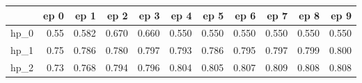 \begin{tabular}{lrrrrrrrrrr}
\toprule
{} &  ep 0 &   ep 1 &   ep 2 &   ep 3 &   ep 4 &   ep 5 &   ep 6 &   ep 7 &   ep 8 &   ep 9 \\
\midrule
hp\_0 &  0.55 &  0.582 &  0.670 &  0.660 &  0.550 &  0.550 &  0.550 &  0.550 &  0.550 &  0.550 \\
hp\_1 &  0.75 &  0.786 &  0.780 &  0.797 &  0.793 &  0.786 &  0.795 &  0.797 &  0.799 &  0.800 \\
hp\_2 &  0.73 &  0.768 &  0.794 &  0.796 &  0.804 &  0.805 &  0.807 &  0.809 &  0.808 &  0.808 \\
\bottomrule
\end{tabular}
